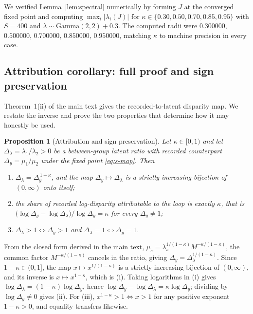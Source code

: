 \documentclass[journal,10pt,onecolumn]{IEEEtran}
\newtheorem{proposition}{Proposition}
\begin{document}
We verified Lemma~\ref{lem:spectral} numerically by forming $J$ at the converged
fixed point and computing $\max_i|\lambda_i(J)|$ for
$\kappa \in \{0.30, 0.50, 0.70, 0.85, 0.95\}$ with $S = 400$ and
$\lambda \sim \mathrm{Gamma}(2,2) + 0.3$. The computed radii were
$0.300000$, $0.500000$, $0.700000$, $0.850000$, $0.950000$, matching $\kappa$ to
machine precision in every case.

\subsection{Attribution corollary: full proof and sign preservation}
\label{sec:s1-attribution}

Theorem~1(ii) of the main text gives the recorded-to-latent disparity map. We
restate the inverse and prove the two properties that determine how it may
honestly be used.

\begin{proposition}[Attribution and sign preservation]
\label{prop:attribution}
Let $\kappa \in [0,1)$ and let $\Delta_{\lambda} = \lambda_1/\lambda_2 > 0$ be a
between-group latent ratio with recorded counterpart $\Delta_y = \mu_1/\mu_2$
under the fixed point \eqref{eq:s-map}. Then
\begin{enumerate}
  \item[(i)] $\Delta_{\lambda} = \Delta_y^{\,1-\kappa}$, and the map
  $\Delta_y \mapsto \Delta_{\lambda}$ is a strictly increasing bijection of
  $(0,\infty)$ onto itself;
  \item[(ii)] the share of recorded log-disparity attributable to the loop is
  exactly $\kappa$, that is
  $\bigl(\log\Delta_y - \log\Delta_{\lambda}\bigr)/\log\Delta_y = \kappa$ for
  every $\Delta_y \ne 1$;
  \item[(iii)] $\Delta_{\lambda} > 1 \iff \Delta_y > 1$ and
  $\Delta_{\lambda} = 1 \iff \Delta_y = 1$.
\end{enumerate}
\end{proposition}

\begin{IEEEproof}
From the closed form derived in the main text,
$\mu_s = \lambda_s^{1/(1-\kappa)}M^{-\kappa/(1-\kappa)}$, the common factor
$M^{-\kappa/(1-\kappa)}$ cancels in the ratio, giving
$\Delta_y = \Delta_{\lambda}^{1/(1-\kappa)}$. Since $1-\kappa \in (0,1]$, the map
$x \mapsto x^{1/(1-\kappa)}$ is a strictly increasing bijection of $(0,\infty)$,
and its inverse is $x \mapsto x^{1-\kappa}$, which is (i). Taking logarithms in
(i) gives $\log\Delta_{\lambda} = (1-\kappa)\log\Delta_y$, hence
$\log\Delta_y - \log\Delta_{\lambda} = \kappa\log\Delta_y$; dividing by
$\log\Delta_y \ne 0$ gives (ii). For (iii), $x^{1-\kappa} > 1 \iff x > 1$ for any
positive exponent $1-\kappa > 0$, and equality transfers likewise.
\end{IEEEproof}
\end{document}
